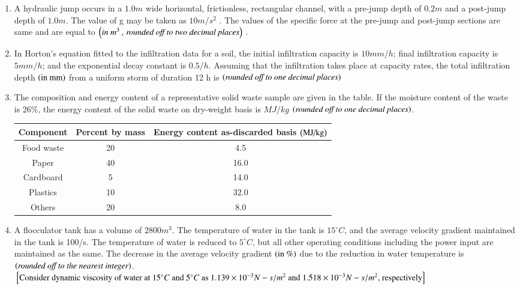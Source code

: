 \documentclass[journal,12pt,onecolumn]{IEEEtran}
\theoremstyle{remark}
\begin{document}
\begin{enumerate}
\item A hydraulic jump occurs in a $1.0 m$ wide horizontal, frictionless, rectangular channel, with a pre-jump depth of $0.2 m$ and a post-jump depth of $1.0 m$. The value of g may be taken as $10 m/s^2$ . The values of the specific force at the pre-jump and post-jump sections are same and are equal to $\left(\textit{in $m^3$
, rounded off to two decimal places}\right)$ \underline{\hspace{3cm}}.

\hfill{}

\item In Horton’s equation fitted to the infiltration data for a soil, the initial infiltration capacity is $10 mm/h$; final infiltration capacity is $5 mm/h$; and the exponential decay constant is $0.5 /h$. Assuming that the infiltration takes place at capacity rates, the total infiltration depth $\left(\text{in mm}\right)$ from a uniform storm of duration 12 h is \underline{\hspace{4cm}} $\left(\textit{rounded off to one decimal places}\right)$

\hfill{}

\item The composition and energy content of a representative solid waste sample are given in the table. If the moisture content of the waste is 26\%, the energy content of the solid waste on dry-weight basis is \underline{\hspace{3cm}}$MJ/kg$ $\left(\textit{rounded off to one decimal places}\right)$.

\hfill{}
\begin{table}[H]
\centering
\begin{tabular}{|c|c|c|}
\hline
\textbf{Component} & \textbf{Percent by mass} & \textbf{Energy content as-discarded basis $\left(\text{MJ/kg}\right)$}\\
\hline
Food waste & 20 & 4.5\\
\hline
Paper & 40 & 16.0\\
\hline
Cardboard & 5 & 14.0\\
\hline
Plastics & 10 & 32.0\\
\hline
Others & 20 & 8.0\\
\hline
\end{tabular}
\end{table}

\item A flocculator tank has a volume of $2800 m^3$. The temperature of water in the tank is $15^\circ C$, and the average velocity gradient maintained in the tank is 100/s. The temperature of water is reduced to $5^\circ C$, but all other operating conditions including the power input are maintained as the same. The decrease in the average velocity gradient $\left(\text{in \%}\right)$ due to the reduction in water temperature is \underline{\hspace{2cm}} $\left(\textit{rounded off to the nearest integer}\right)$.\\
${}\left[\text{Consider dynamic viscosity of water at $15^\circ C$ and $5^\circ C$ as $1.139\times10^{-3} N-s/m^2$ and $1.518\times10^{-3} N-s/m^2$, respectively}\right]$


\end{enumerate}
\end{document}

